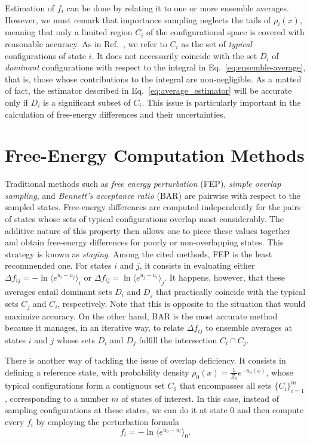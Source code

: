 \documentclass[aip,jcp,reprint,amsmath,amssymb]{revtex4-1}
\begin{document}
Estimation of $f_i$ can be done by relating it to one or more ensemble averages. However, we must remark that importance sampling neglects the tails of $\rho_i(x)$, meaning that only a limited region $C_i$ of the configurational space is covered with reasonable accuracy. As in Ref.~, we refer to $C_i$ as the set of \textit{typical} configurations of state $i$. It does not necessarily coincide with the set $D_i$ of \textit{dominant} configurations with respect to the integral in Eq.~\eqref{eq:ensemble-average}, that is, those whose contributions to the integral are non-negligible. As a matted of fact, the estimator described in Eq.~\eqref{eq:average_estimator} will be accurate only if $D_i$ is a significant subset of $C_i$. This issue is particularly important in the calculation of free-energy differences and their uncertainties.

\section{Free-Energy Computation Methods}

Traditional methods such as \textit{free energy perturbation} (FEP),\cite{Zwanzig_1954} \textit{simple overlap sampling},\cite{Lee_1980, Lu_2003} and \textit{Bennett's acceptance ratio} (BAR)\cite{Bennett_1976} are pairwise with respect to the sampled states. Free-energy differences are computed independently for the pairs of states whose sets of typical configurations overlap most considerably. The additive nature of this property then allows one to piece these values together and obtain free-energy differences for poorly or non-overlapping states. This strategy is known as \textit{staging}.\cite{Kofke_1998} Among the cited methods, FEP is the least recommended one. For states $i$ and $j$, it consists in evaluating either $\Delta f_{ij} = -\ln \langle e^{u_i - u_j} \rangle_i$ or $\Delta f_{ij} = \ln \langle e^{u_j - u_i} \rangle_j$.\cite{Zwanzig_1954} It happens, however, that these averages entail dominant sets $D_i$ and $D_j$ that practically coincide with the typical sets $C_j$ and $C_i$, respectively.\cite{Jarzynski_2006} Note that this is opposite to the situation that would maximize accuracy. On the other hand, BAR is the most accurate method because it manages, in an iterative way, to relate $\Delta f_{ij}$ to ensemble averages at states $i$ and $j$ whose sets $D_i$ and $D_j$ fulfill the intersection $C_i \cap C_j$.

There is another way of tackling the issue of overlap deficiency. It consists in defining a reference state, with probability density $\rho_0(x) = \frac{1}{Z_0}e^{-u_0(x)}$, whose typical configurations form a contiguous set $C_0$ that encompasses all sets $\{C_i\}_{i=1}^m$, corresponding to a number $m$ of states of interest. In this case, instead of sampling configurations at these states, we can do it at state $0$ and then compute every $f_i$ by employing the perturbation formula
\begin{equation}
\label{eq:umbrella sampling free energy}
f_i = -\ln \langle e^{u_0-u_i} \rangle_0.
\end{equation}
\end{document}
